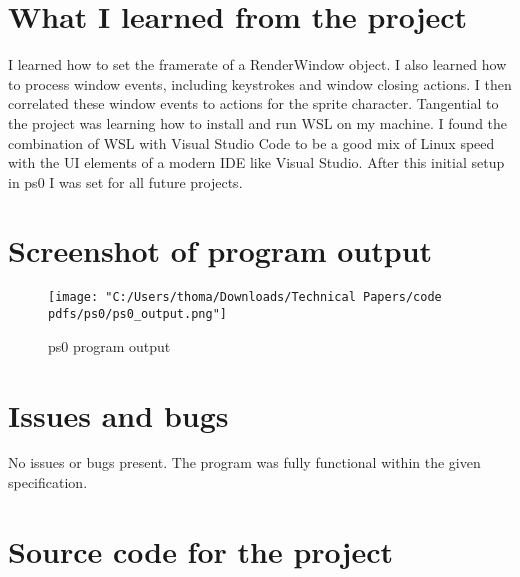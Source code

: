 \documentclass[12pt]{article}
\begin{document}
\section[3]{What I learned from the project}
\hfill\begin{minipage}{\dimexpr\textwidth-1cm}
I learned how to set the framerate of a RenderWindow object. I also learned how to process window events, including keystrokes and window closing actions. I then correlated these window events to actions for the sprite character. Tangential to the project was learning how to install and run WSL on my machine. I found the combination of WSL with Visual Studio Code to be a good mix of Linux speed with the UI elements of a modern IDE like Visual Studio. After this initial setup in ps0 I was set for all future projects.
\end{minipage}

\section[4]{Screenshot of program output}
\begin{figure}[H]
  \centering
  \texttt{[image: "C:/Users/thoma/Downloads/Technical Papers/code pdfs/ps0/ps0\_output.png"]}
  \caption{ps0 program output}
  \label{fig:ps0_output}
\end{figure}

\section[5]{Issues and bugs}
\hfill\begin{minipage}{\dimexpr\textwidth-1cm}
No issues or bugs present. \newline
The program was fully functional within the given specification.
\end{minipage}

\section[6]{Source code for the project}


\end{document}

